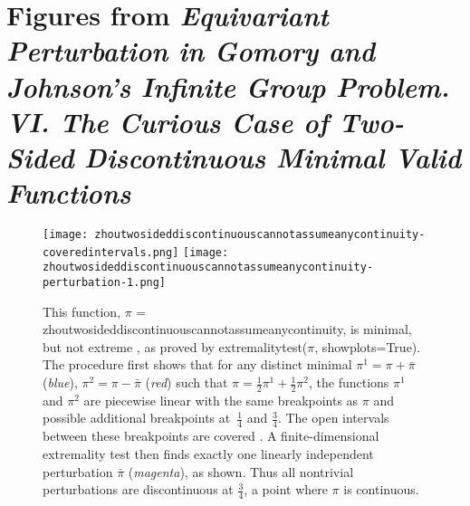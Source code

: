 \documentclass[10pt,reqno]{amsart}
\date{$\relax$Revision: 2348 $ - \ $Date: 2018-01-28 20:35:05 -0800 (Sun, 28 Jan 2018) $ $\!\!\!}
\newcommand{\0}{{\ve 0}}
\theoremstyle{definition}
\let\Myunderscore=\textunderscore   %
\def\Myunderscore{\textunderscore}%
\newcommand\underscore{\Myunderscore\allowbreak}
\let\_=\underscore
\DeclareRobustCommand\sage[1]{\textsf{\upshape #1}}
\begin{document}
 \newcommand{\tgreen}[1]{\textsf{\textcolor {ForestGreen} {#1}}}
 \newcommand{\tred}[1]{\texttt{\textcolor {red} {#1}}}
 \newcommand{\tblue}[1]{\textcolor {blue} {#1}}




\setcounter{page}{16}
\setcounter{section}{5}
\thispagestyle{plain}

\section{Figures from \itshape Equivariant Perturbation in Gomory and Johnson's Infinite Group 
  Problem. VI. The Curious Case of Two-Sided Discontinuous Minimal Valid
  Functions}

\begin{figure}[h]
\begin{center}
\texttt{[image: zhou\_two\_sided\_discontinuous\_cannot\_assume\_any\_continuity-covered\_intervals.png]}\quad
\texttt{[image: zhou\_two\_sided\_discontinuous\_cannot\_assume\_any\_continuity-perturbation-1.png]}
\end{center}
\caption{This function, \sage{$\pi$ = \sage{zhou\_two\_sided\_discontinuous\_cannot\_assume\_any\_continuity}}, is
  minimal, but not extreme%
  , as proved by
  \sage{extremality\_test($\pi$, show\underscore{}plots=True)}.
  The procedure first shows that
  for any distinct minimal $\pi^1 = \pi + \bar\pi$ (\emph{blue}), $\pi^2 = \pi
  - \bar\pi$ (\emph{red}) such that $\pi = \tfrac{1}{2}\pi^1
  + \tfrac{1}{2} \pi^2$, the functions $\pi^1$ and $\pi^2$ are
  piecewise linear with the same breakpoints as $\pi$ and possible additional
  breakpoints at~$\frac14$ and $\frac34$.   The open intervals between these
  breakpoints are covered%
  . %
  A finite-dimensional extremality
  test then finds exactly one linearly independent perturbation $\bar\pi$
  (\emph{magenta}), as shown. Thus all nontrivial perturbations are discontinuous at
  $\frac{3}{4}$, a point where $\pi$ is continuous.
}
\label{fig:two_sided_discontinuous_cannot_assume_any_continuity}
\end{figure}
\end{document}
